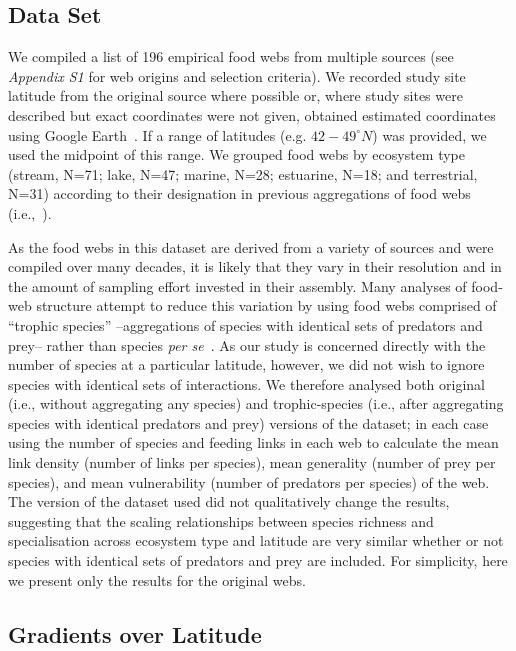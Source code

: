 \documentclass[12pt]{article}
\begin{document}
  \subsection*{Data Set} 

    We compiled a list of 196 empirical food webs from
    multiple sources (see \emph{Appendix S1} for web origins and selection
    criteria). We recorded study site latitude from the original source where
    possible or, where study sites were described but exact coordinates were not
    given, obtained estimated coordinates using Google Earth~\cite{GoogleEarth}.
    If a range of latitudes (e.g. $42-49^{\circ}N$) was provided, we used the midpoint
    of this range. We grouped food webs by ecosystem type (stream, N=71; lake, N=47; marine, 
    N=28; estuarine, N=18; and terrestrial, N=31) according to their designation in 
    previous aggregations of food webs (i.e.,~\cite{GlobalWeb,Riede2011,Dunne2013}).


    As the food webs in this dataset are derived from a variety of sources and were compiled over many decades, it
    is likely that they vary in their resolution and in the amount of sampling effort invested in their assembly.
    Many analyses of food-web structure attempt to reduce this variation by using food webs comprised of ``trophic
    species'' --aggregations of species with identical sets of predators and prey-- rather than  
    species \emph{per se}~\cite{Martinez1991,Dunne2004,Vermaat2009,Dunne2013}. As our study
    is concerned directly with the number of species at a particular latitude, however, we did not wish to ignore 
    species with identical sets of interactions. We therefore analysed both original (i.e., without aggregating 
    any species) and trophic-species (i.e., after aggregating species with identical predators and prey) versions
    of the dataset; in each case using the number of species and 
    feeding links in each web to calculate the mean link density (number of links per species), mean generality 
    (number of prey per species), and mean vulnerability (number of predators per species) of the web. 
    The version of the dataset used did not qualitatively change the results, suggesting that
    the scaling relationships between species richness and specialisation across ecosystem type and latitude are very 
    similar whether or not species with identical sets of predators and prey are included. For simplicity, 
    here we present only the results for the original webs.


  \subsection*{Gradients over Latitude}
\end{document}
